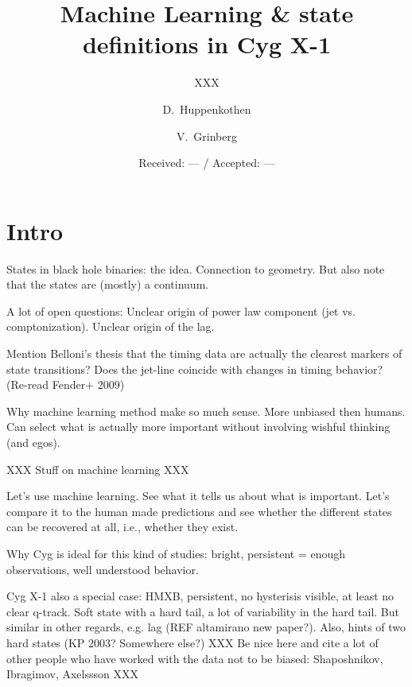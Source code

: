 \documentclass{aa}
\begin{document}
\title{Machine Learning \& state definitions in Cyg X-1} 
\subtitle{XXX}


\author{\mbox{D.~Huppenkothen\inst{\ref{affil:nyu}}} \and
\mbox{V.~Grinberg\inst{\ref{affil:mit}}}
} 
\date {Received: --- / Accepted: ---}



\maketitle

\section{Intro}

States in black hole binaries: the idea. Connection to geometry. But
also note that the states are (mostly) a continuum.

A lot of open questions: Unclear origin of power law component (jet
vs. comptonization). Unclear origin of the lag.

Mention Belloni's thesis that the timing data are actually the
clearest markers of state transitions? Does the jet-line coincide with
changes in timing behavior? (Re-read Fender+ 2009)



Why machine learning method make so much sense. More unbiased then
humans. Can select what is actually more important without involving
wishful thinking (and egos).

XXX Stuff on machine learning XXX

Let's use machine learning. See what it tells us about what is
important. Let's compare it to the human made predictions and see
whether the different states can be recovered at all, i.e., whether
they exist.

Why Cyg is ideal for this kind of studies: bright, persistent = enough
observations, well understood behavior.

Cyg X-1 also a special case: HMXB, persistent, no hysterisis visible,
at least no clear q-track. Soft state with a hard tail, a lot of
variability in the hard tail. But similar in other regards, e.g. lag
(REF altamirano new paper?). Also, hints of two hard states (KP 2003?
Somewhere else?) XXX Be nice here and cite a lot of other people who
have worked with the data not to be biased: Shaposhnikov, Ibragimov,
Axelssson XXX
\end{document}
